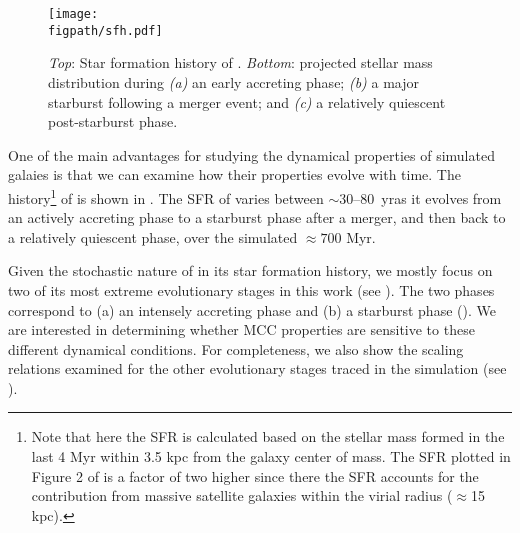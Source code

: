 \IfFileExists{emulateapjlegacy.cls}{\documentclass[iop]{emulateapjlegacy}}{\documentclass[iop]{emulateapj}}
\def\figpath{./Fig}
\begin{document}
\begin{figure*}
\centering
\texttt{[image: \\figpath/sfh.pdf]}
\caption{
    {\it Top}: Star formation history of \flower. {\it Bottom}:
    projected stellar mass distribution during {\it (a)} an early
    accreting phase;  {\it (b)} a major starburst following a merger
    event; and {\it (c)} a relatively quiescent post-starburst
    phase. 
\label{fig:SFH}}
\end{figure*}

One of the main advantages for studying the dynamical properties of simulated galaies is that we can examine how their properties evolve with time.
%
The \SF history\footnote{Note that here the SFR is calculated based on
  the stellar mass formed in the last 4 Myr within 3.5 kpc from the
  galaxy center of mass. The SFR plotted in Figure 2 of
  \citet{Pallottini17b} is a factor of two higher since there the SFR
  accounts for the contribution from massive satellite galaxies within
  the virial radius ($\approx$15\,kpc).} of \flower is shown in
. The SFR of \flower varies between $\sim$30--80 \Msun\,yr\pmOne as it evolves from an actively accreting phase to a starburst phase after a merger, and then back to a relatively quiescent phase, over the simulated $\approx 700$ Myr.

Given the stochastic nature of \flower in its star formation history, we mostly focus on
two of its most extreme evolutionary stages in this work (see ).
The two phases correspond to (a) an intensely accreting phase and
(b) a starburst phase (). We are interested in determining whether 
MCC properties are sensitive to these different dynamical
conditions. For completeness, we also show the scaling relations examined for the other evolutionary stages traced
in the simulation (see ).
\end{document}
